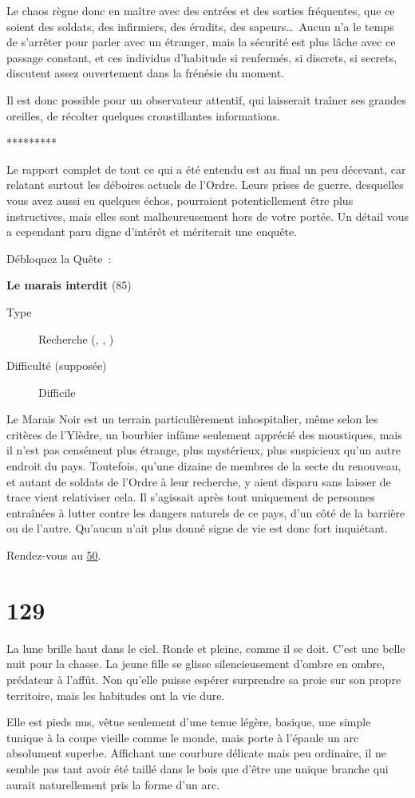 \documentclass{report}
\newcommand{\gsection}[1]{
    \section{#1}
    \label{section-#1}
}
\newcommand{\glink}[1]{\hyperref[section-#1]{#1}}
\newcommand{\quest}[5]{
    \begin{mdframed}[innertopmargin=0.5cm,innerbottommargin=0.5cm,leftmargin=0.5cm,rightmargin=0.5cm]
        \begin{center}
            \textbf{#1} (#2)
        \end{center}
        \begin{description}
            \item[Type] #3
            \item[Difficulté (supposée)] #4
        \end{description}
        #5
    \end{mdframed}
}
\newcommand{\ellipse}{
    \begin{center}
        *********
    \end{center}
}
\begin{document}
Le chaos règne donc en maître avec des entrées et des sorties fréquentes, que ce soient des soldats, des infirmiers, des érudits, des sapeurs\dots~Aucun n'a le temps de s'arrêter pour parler avec un étranger, mais la sécurité est plus lâche avec ce passage constant, et ces individus d'habitude si renfermés, si discrets, si secrets, discutent assez ouvertement dans la frénésie du moment.

Il est donc possible pour un observateur attentif, qui laisserait traîner ses grandes oreilles, de récolter quelques croustillantes informations.

\ellipse

Le rapport complet de tout ce qui a été entendu est au final un peu décevant, car relatant surtout les déboires actuels de l'Ordre. Leurs prises de guerre, desquelles vous avez aussi eu quelques échos, pourraient potentiellement être plus instructives, mais elles sont malheureusement hors de votre portée.
Un détail vous a cependant paru digne d'intérêt et mériterait une enquête.

Débloquez la Quête :

\quest{Le marais interdit}{85}{Recherche (\ankh, \caduceus, \cross)}{Difficile}{
Le Marais Noir est un terrain particulièrement inhospitalier, même selon les critères de l'Ylèdre, un bourbier infâme seulement apprécié des moustiques, mais il n'est pas censément plus étrange, plus mystérieux, plus suspicieux qu'un autre endroit du pays. Toutefois, qu'une dizaine de membres de la secte du renouveau, et autant de soldats de l'Ordre à leur recherche, y aient disparu sans laisser de trace vient relativiser cela. Il s'agissait après tout uniquement de personnes entraînées à lutter contre les dangers naturels de ce pays, d'un côté de la barrière ou de l'autre. Qu'aucun n'ait plus donné signe de vie est donc fort inquiétant.
}

Rendez-vous au \glink{50}.

\gsection{129}

La lune brille haut dans le ciel. Ronde et pleine, comme il se doit. C'est une belle nuit pour la chasse. La jeune fille se glisse silencieusement d'ombre en ombre, prédateur à l'affût. Non qu'elle puisse espérer surprendre sa proie sur son propre territoire, mais les habitudes ont la vie dure.

Elle est pieds nus, vêtue seulement d'une tenue légère, basique, une simple tunique à la coupe vieille comme le monde, mais porte à l'épaule un arc absolument superbe. Affichant une courbure délicate mais peu ordinaire, il ne semble pas tant avoir été taillé dans le bois que d'être une unique branche qui aurait naturellement pris la forme d'un arc.
\end{document}
